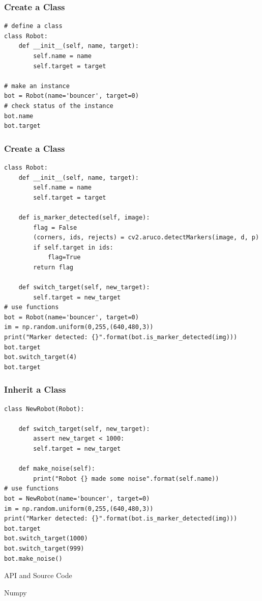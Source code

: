 \documentclass[12pt,letterpaper]{beamer}
\begin{document}
\begin{frame}[fragile]
    \frametitle{Create a Class}

    {\scriptsize
    \begin{verbatim}
# define a class
class Robot:
    def __init__(self, name, target):
        self.name = name
        self.target = target

# make an instance
bot = Robot(name='bouncer', target=0)
# check status of the instance 
bot.name
bot.target
    \end{verbatim}
    }
\end{frame}

\begin{frame}[fragile]
    \frametitle{Create a Class}

    {\scriptsize
    \begin{verbatim}
class Robot:
    def __init__(self, name, target):
        self.name = name
        self.target = target

    def is_marker_detected(self, image):
        flag = False
        (corners, ids, rejects) = cv2.aruco.detectMarkers(image, d, p)
        if self.target in ids:
            flag=True
        return flag
            
    def switch_target(self, new_target):
        self.target = new_target
# use functions 
bot = Robot(name='bouncer', target=0)
im = np.random.uniform(0,255,(640,480,3))
print("Marker detected: {}".format(bot.is_marker_detected(img)))
bot.target
bot.switch_target(4)
bot.target
    \end{verbatim}
    }
\end{frame}

\begin{frame}[fragile]
    \frametitle{Inherit a Class}

    {\scriptsize
    \begin{verbatim}
class NewRobot(Robot):

    def switch_target(self, new_target):
        assert new_target < 1000:
        self.target = new_target

    def make_noise(self):
        print("Robot {} made some noise".format(self.name))
# use functions 
bot = NewRobot(name='bouncer', target=0)
im = np.random.uniform(0,255,(640,480,3))
print("Marker detected: {}".format(bot.is_marker_detected(img)))
bot.target
bot.switch_target(1000)
bot.switch_target(999)
bot.make_noise()
    \end{verbatim}
    }
\end{frame}

\begin{frame}{API and Source Code}
\end{frame}

\begin{frame}{Numpy}
\end{frame}
\end{document}
